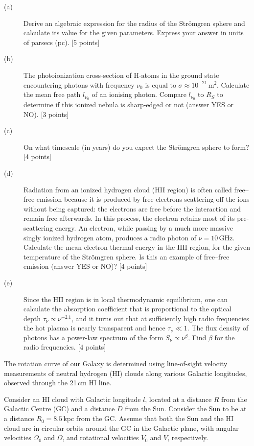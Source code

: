\begin{description}
\item[(a)] Derive an algebraic expression for the radius of the Str\"omgren
  sphere and calculate its value for the given parameters. Express your answer in
  units of parsecs (pc). \hfill[5 points]
\item[(b)] The photoionization cross-section of H-atoms in the ground state
  encountering photons with frequency $\nu_0$ is equal to
  $\sigma \approx 10^{-21}$\,m$^2$. Calculate the mean free path
  $l_{\nu_0}$ of an ionising photon. Compare $l_{\nu_0}$ to $R_S$ to determine
  if this ionized nebula is sharp-edged or not (answer YES or NO).
  \hfill[3 points]
\item[(c)] On what timescale (in years) do you expect the Str\"omgren sphere to
  form? \hfill[4 points]
\item[(d)] Radiation from an ionized hydrogen cloud (HII region) is often called
  free--free emission because it is produced by free electrons scattering off the
  ions without being captured: the electrons are free before the interaction and
  remain free afterwards. In this process, the electron retains most of its
  pre-scattering energy. An electron, while passing by a much more massive singly
  ionized hydrogen atom, produces a radio photon of $\nu = 10$\,GHz. Calculate
  the mean electron thermal energy in the HII region, for the given temperature
  of the Str\"omgren sphere. Is this an example of free--free emission (answer
  YES or NO)? \hfill[4 points]
\item[(e)] Since the HII region is in local thermodynamic equilibrium, one can
  calculate the absorption coefficient that is proportional to the optical depth
  $\tau_\nu \propto \nu^{-2.1}$, and it turns out that at sufficiently high radio
  frequencies the hot plasma is nearly transparent and hence
  $\tau_\nu \ll 1$. The flux density of photons has a power-law spectrum of the
  form $S_\nu \propto \nu^{\beta}$. Find $\beta$ for the radio frequencies.
  \hfill[4 points]
\end{description}

The rotation curve of our Galaxy is determined using line-of-sight velocity
measurements of neutral hydrogen (HI) clouds along various Galactic longitudes,
observed through the 21\,cm HI line.

Consider an HI cloud with Galactic longitude $l$, located at a distance $R$ from
the Galactic Centre (GC) and a distance $D$ from the Sun. Consider the Sun to be
at a distance $R_0 = 8.5$\,kpc from the GC. Assume that both the Sun and the HI
cloud are in circular orbits around the GC in the Galactic plane, with angular
velocities $\Omega_0$ and $\Omega$, and rotational velocities $V_0$ and $V$,
respectively.

